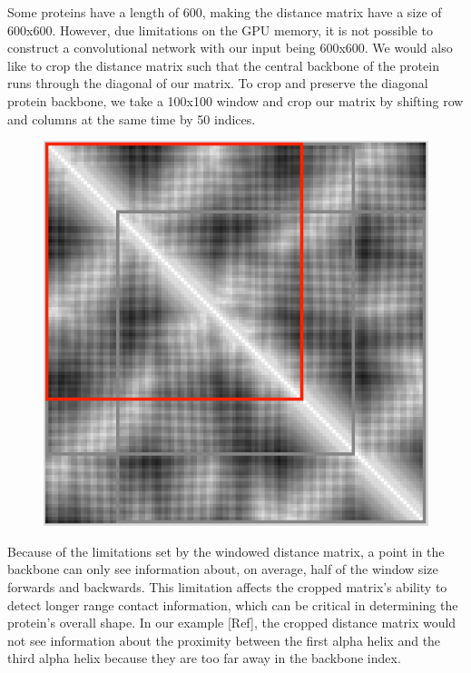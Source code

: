 \documentclass[12pt, a4paper, twocolumn, fullpage]{article}
\theoremstyle{plain}
\theoremstyle{definition}
\theoremstyle{remark}
\begin{document}
Some proteins have a length of 600, making the distance matrix have a size of 600x600. However, due limitations on the GPU memory, it is not possible to construct a convolutional network with our input being 600x600. We would also like to crop the distance matrix such that the central backbone of the protein runs through the diagonal of our matrix. To crop and preserve the diagonal protein backbone, we take a 100x100 window and crop our matrix by shifting row and columns at the same time by 50 indices.

\begin{figure}[h]
	\centering
	\includegraphics[width=.7\linewidth]{cropMat}
	\caption{}
	\label{fig:network}
\end{figure}

Because of the limitations set by the windowed distance matrix, a point in the backbone can only see information about, on average, half of the window size forwards and backwards. This limitation affects the cropped matrix's ability to detect longer range contact information, which can be critical in determining the protein's overall shape. In our example [Ref], the cropped distance matrix would not see information about the proximity between the first alpha helix and the third alpha helix because they are too far away in the backbone index.
\end{document}

